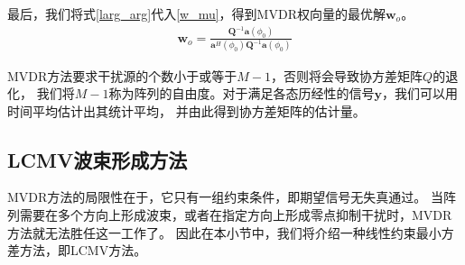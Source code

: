 \documentclass[master]{thesis-uestc}
\begin{document}
最后，我们将式\eqref{larg_arg}代入\eqref{w_mu}，得到MVDR权向量的最优解$\bm{w}_o$。
\begin{equation}\label{w_solve}
    \begin{aligned}
    \bm{w}_o = \frac{\bm{Q}^{-1}\bm{a}(\phi_0)}{\bm{a}^H(\phi_0)\bm{Q}^{-1}\bm{a}(\phi_0)}
    \end{aligned}
\end{equation}

MVDR方法要求干扰源的个数小于或等于$M-1$，否则将会导致协方差矩阵$Q$的退化，
我们将$M-1$称为阵列的自由度。对于满足各态历经性的信号$\bm{y}$，我们可以用时间平均估计出其统计平均，
并由此得到协方差矩阵的估计量。

\subsection{LCMV波束形成方法}
MVDR方法的局限性在于，它只有一组约束条件，即期望信号无失真通过。
当阵列需要在多个方向上形成波束，或者在指定方向上形成零点抑制干扰时，MVDR方法就无法胜任这一工作了。
因此在本小节中，我们将介绍一种线性约束最小方差方法，即LCMV方法。
\end{document}
